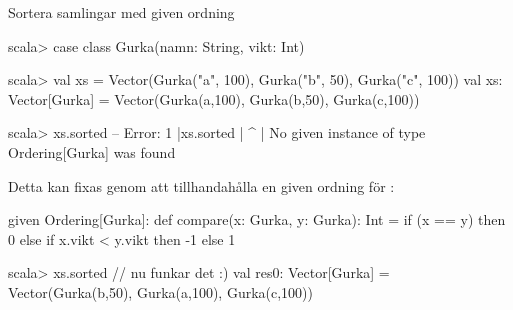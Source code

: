 


\begin{Slide}{Sortera samlingar med given ordning}\SlideFontSmall
\begin{REPLsmall}
scala> case class Gurka(namn: String, vikt: Int)

scala> val xs = Vector(Gurka("a", 100), Gurka("b", 50), Gurka("c", 100))
val xs: Vector[Gurka] = Vector(Gurka(a,100), Gurka(b,50), Gurka(c,100))

scala> xs.sorted
-- Error:
1 |xs.sorted
  | ^
  | No given instance of type Ordering[Gurka] was found
\end{REPLsmall}
\pause
Detta kan fixas genom att tillhandahålla en given ordning för :
\begin{Code}
given Ordering[Gurka]:
  def compare(x: Gurka, y: Gurka): Int =
    if (x == y) then 0 
    else if x.vikt < y.vikt then -1 
    else 1
\end{Code}
\begin{REPL}
scala> xs.sorted   // nu funkar det :)
val res0: Vector[Gurka] = Vector(Gurka(b,50), Gurka(a,100), Gurka(c,100))
\end{REPL}
\end{Slide}

